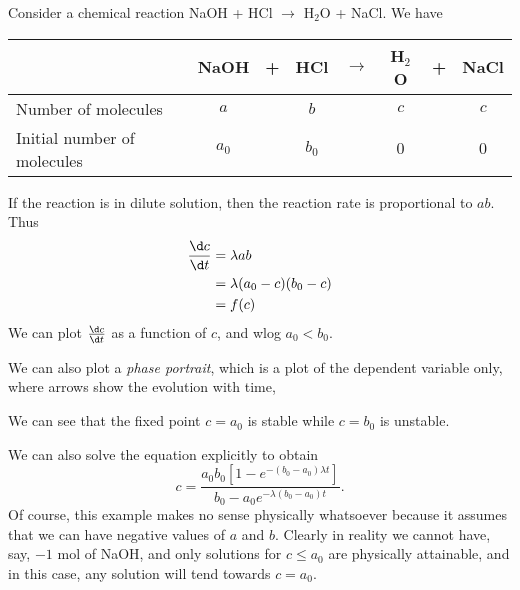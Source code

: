 \documentclass[a4paper]{article}
\begin{document}
\begin{eg}
  Consider a chemical reaction NaOH + HCl $\rightarrow$ H$_2$O + NaCl. We have
  \begin{center}
    \begin{tabular}{lccccccc}
      \toprule
      & NaOH & + & HCl & $\rightarrow$ & H$_2$O & + & NaCl \\
      \midrule
      Number of molecules & $a$ & & $b$ & & $c$ & & $c$ \\
      Initial number of molecules & $a_0$ & & $b_0$ & & $0$ & & $0$ \\
      \bottomrule
    \end{tabular}
  \end{center}
  If the reaction is in dilute solution, then the reaction rate is proportional to $ab$. Thus
  \begin{align*}
    \frac{\d c}{\d t} &= \lambda ab\\
    &= \lambda (a_0 - c)(b_0 - c)\\
    &= f(c)
  \end{align*}
  We can plot $\frac{\d c}{\d t}$ as a function of $c$, and wlog $a_0 < b_0$.
  \begin{center}
  \end{center}
  We can also plot a \emph{phase portrait}, which is a plot of the dependent variable only, where arrows show the evolution with time,
  \begin{center}
  \end{center}
  We can see that the fixed point $c = a_0$ is stable while $c = b_0$ is unstable.

  We can also solve the equation explicitly to obtain
  \[
    c = \frac{a_0b_0[1 - e^{-(b_0 - a_0)\lambda t}]}{b_0 - a_0e^{-\lambda(b_0-a_0)t}}.
  \]
  Of course, this example makes no sense physically whatsoever because it assumes that we can have negative values of $a$ and $b$. Clearly in reality we cannot have, say, $-1$ mol of NaOH, and only solutions for $c \leq a_0$ are physically attainable, and in this case, any solution will tend towards $c = a_0$.
\end{eg}
\end{document}
